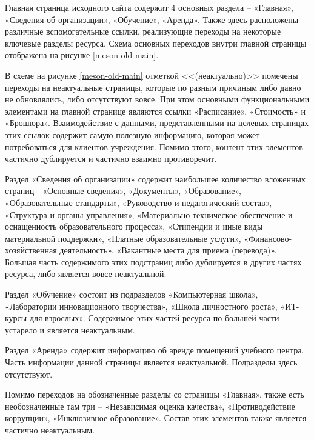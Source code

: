 Главная страница исходного сайта содержит 4 основных раздела -- «Главная», «Сведения об организации», «Обучение», «Аренда».
Также здесь расположены различные вспомогательные ссылки, реализующие переходы на некоторые ключевые разделы ресурса.
Схема основных переходов внутри главной страницы отображена на рисунке \ref{meson-old-main}.


В схеме на рисунке \ref{meson-old-main} отметкой <<(неактуально)>> помечены переходы на неактуальные страницы, которые по разным причиным либо давно не обновлялись, либо отсутствуют вовсе.
При этом основными функциональными элементами на главной странице являются ссылки «Расписание», «Стоимость» и «Брошюра».
Взаимодействие с данными, представленными на целевых страницах этих ссылок содержит самую полезную информацию, которая может потребоваться для клиентов учреждения.
Помимо этого, контент этих элементов частично дублируется и частично взаимно противоречит.

Раздел «Сведения об организации» содержит наибольшее количество вложенных страниц - «Основные сведения», «Документы», «Образование», «Образовательные стандарты», «Руководство и педагогический состав», «Структура и органы управления», «Материально-техническое обеспечение и оснащенность образовательного процесса», «Стипендии и иные виды материальной поддержки», «Платные образовательные услуги», «Финансово-хозяйственная деятельность», «Вакантные места для приема (перевода)».
Большая часть содержимого этих подстраниц либо дублируется в других частях ресурса, либо является вовсе неактуальной.

Раздел «Обучение» состоит из подразделов «Компьютерная школа», «Лаборатории инновационного творчества», «Школа личностного роста», «ИТ-курсы для взрослых».
Содержимое этих частей ресурса по большей части устарело и является неактуальным.

Раздел «Аренда» содержит информацию об аренде помещений учебного центра.
Часть информации данной страницы является неактуальной.
Подразделы здесь отсутствуют.

Помимо переходов на обозначенные разделы со страницы «Главная», также есть необозначенные там три -- «Независимая оценка качества», «Противодействие коррупции», «Инклюзивное образование».
Состав этих элементов также является частично неактуальным.


